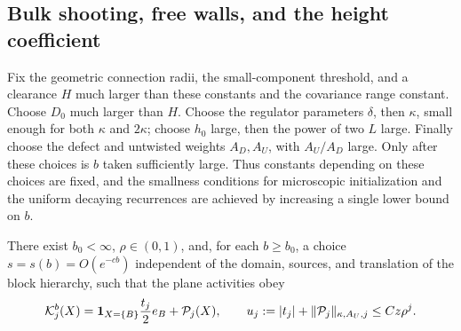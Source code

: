 \subsection{Bulk shooting, free walls, and the height coefficient}

Fix the geometric connection radii, the small-component threshold, and a
clearance $H$ much larger than these constants and the covariance range
constant.  Choose $D_0$ much larger than $H$.  Choose the regulator
parameters $\delta$, then $\kappa$, small enough for both $\kappa$ and
$2\kappa$; choose $h_0$ large, then the power of two $L$ large.  Finally
choose the defect and untwisted weights $A_D,A_U$, with $A_U/A_D$ large.
Only after these choices is $b$ taken sufficiently large.  Thus constants
depending on these choices are fixed, and the smallness conditions for
microscopic initialization and the uniform decaying recurrences are
achieved by increasing a single lower bound on $b$.

\begin{proposition}\label{vi:bulk-tuning}
There exist $b_0<\infty$, $\rho\in(0,1)$, and, for each $b\ge b_0$, a
choice $s=s(b)=O(e^{-cb})$ independent of the domain, sources, and
translation of the block hierarchy, such that the plane activities obey
\begin{equation}
 \mathcal K_j^b(X)=\mathbf 1_{X=\{B\}}\frac{t_j}2 e_B+
                        \mathcal P_j(X),\qquad
 u_j:=|t_j|+\lVert \mathcal P_j\rVert_{\kappa,A_U,j}
                       \le C z\rho^j .                  \label{vi:bulk-decay}
\end{equation}
\end{proposition}

